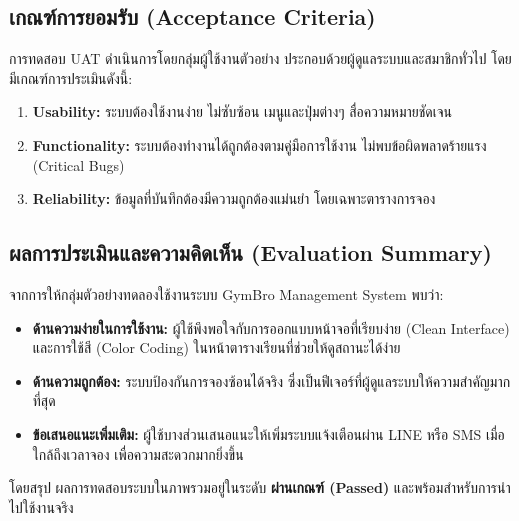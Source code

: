 \subsection{เกณฑ์การยอมรับ (Acceptance Criteria)}
การทดสอบ UAT ดำเนินการโดยกลุ่มผู้ใช้งานตัวอย่าง ประกอบด้วยผู้ดูแลระบบและสมาชิกทั่วไป โดยมีเกณฑ์การประเมินดังนี้:
\begin{enumerate}
    \item \textbf{Usability:} ระบบต้องใช้งานง่าย ไม่ซับซ้อน เมนูและปุ่มต่างๆ สื่อความหมายชัดเจน
    \item \textbf{Functionality:} ระบบต้องทำงานได้ถูกต้องตามคู่มือการใช้งาน ไม่พบข้อผิดพลาดร้ายแรง (Critical Bugs)
    \item \textbf{Reliability:} ข้อมูลที่บันทึกต้องมีความถูกต้องแม่นยำ โดยเฉพาะตารางการจอง
\end{enumerate}

\subsection{ผลการประเมินและความคิดเห็น (Evaluation Summary)}
จากการให้กลุ่มตัวอย่างทดลองใช้งานระบบ GymBro Management System พบว่า:
\begin{itemize}
    \item \textbf{ด้านความง่ายในการใช้งาน:} ผู้ใช้พึงพอใจกับการออกแบบหน้าจอที่เรียบง่าย (Clean Interface) และการใช้สี (Color Coding) ในหน้าตารางเรียนที่ช่วยให้ดูสถานะได้ง่าย
    \item \textbf{ด้านความถูกต้อง:} ระบบป้องกันการจองซ้อนได้จริง ซึ่งเป็นฟีเจอร์ที่ผู้ดูแลระบบให้ความสำคัญมากที่สุด
    \item \textbf{ข้อเสนอแนะเพิ่มเติม:} ผู้ใช้บางส่วนเสนอแนะให้เพิ่มระบบแจ้งเตือนผ่าน LINE หรือ SMS เมื่อใกล้ถึงเวลาจอง เพื่อความสะดวกมากยิ่งขึ้น
\end{itemize}

โดยสรุป ผลการทดสอบระบบในภาพรวมอยู่ในระดับ \textbf{ผ่านเกณฑ์ (Passed)} และพร้อมสำหรับการนำไปใช้งานจริง
